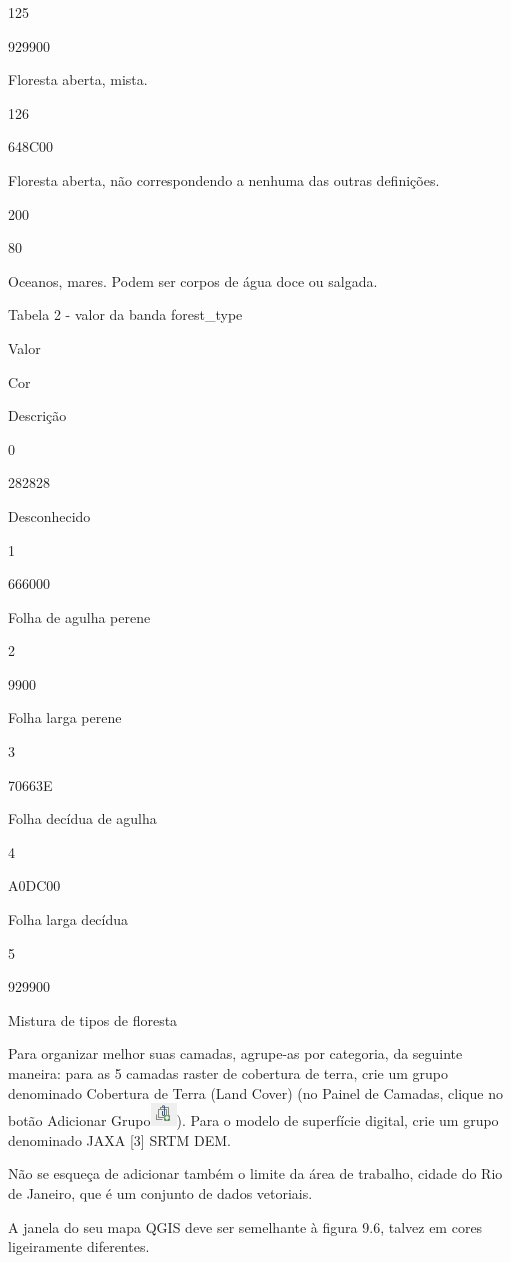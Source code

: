 \documentclass[
]{krantz}
\begin{document}
125

929900

Floresta aberta, mista.

126

648C00

Floresta aberta, não correspondendo a nenhuma das outras definições.

200

80

Oceanos, mares. Podem ser corpos de água doce ou salgada.

Tabela 2 - valor da banda forest\_type

Valor

Cor

Descrição

0

282828

Desconhecido

1

666000

Folha de agulha perene

2

9900

Folha larga perene

3

70663E

Folha decídua de agulha

4

A0DC00

Folha larga decídua

5

929900

Mistura de tipos de floresta

Para organizar melhor suas camadas, agrupe-as por categoria, da seguinte maneira: para as 5 camadas raster de cobertura de terra, crie um grupo denominado Cobertura de Terra (Land Cover) (no Painel de Camadas, clique no botão Adicionar Grupo\includegraphics{media/modulo9/add-group-btn.png}). Para o modelo de superfície digital, crie um grupo denominado JAXA {[}3{]} SRTM DEM.

Não se esqueça de adicionar também o limite da área de trabalho, cidade do Rio de Janeiro, que é um conjunto de dados vetoriais.

A janela do seu mapa QGIS deve ser semelhante à figura 9.6, talvez em cores ligeiramente diferentes.
\end{document}
